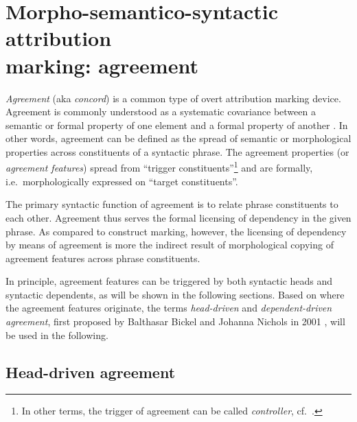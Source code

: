 \section[Agreement]{Morpho-semantico-syntactic attribution\\marking: agreement}

\emph{Agreement} (aka \emph{concord}) is a common type of overt attribution marking device. Agreement is commonly understood as a systematic covariance between a semantic or formal property of one element and a formal property of another \cite[610]{steele1978}. In other words, agreement can be defined as the spread of semantic or morphological properties across constituents of a syntactic phrase. The agreement properties (or \emph{agreement features}) spread from “trigger constituents”\footnote{In other terms, the trigger of agreement can be called \emph{controller}, cf.~\citealt{corbett2006}.} and are formally, i.e.~morphologically expressed on “target constituents”.

The primary syntactic function of agreement is to relate phrase constituents to each other. Agreement thus serves the formal licensing of dependency in the given phrase. As compared to construct marking, however, the licensing of dependency by means of agreement is more the indirect result of morphological copying of agreement features across phrase constituents.

In principle, agreement features can be triggered by both syntactic heads and syntactic dependents, as will be shown in the following sections. Based on where the agreement features originate, the terms \emph{head-driven} and \emph{dependent-driven agreement}, first proposed by Balthasar Bickel and Johanna Nichols in 2001 \citep[published as][]{bickel-etal2007}, will be used in the following.

\subsection{Head-driven agreement} \label{head-driven agreement}

